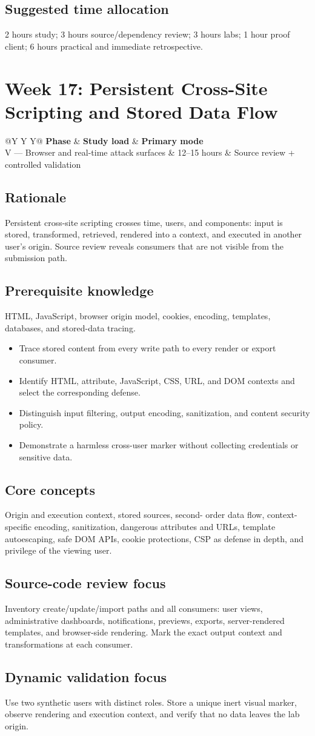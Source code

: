 \documentclass[11pt]{article}
\makeatletter
\newcommand{\weekheader}[4]{%
  \clearpage
  \section{Week #1: #2}
  \begin{tcolorbox}[colback=Navy,colframe=Navy,coltext=white]
    \begin{tabularx}{\linewidth}{@{}Y Y Y@{}}
      \textbf{Phase} & \textbf{Study load} & \textbf{Primary mode}\\
      #3 & #4 hours & Source review + controlled validation
    \end{tabularx}
  \end{tcolorbox}
}
\newcommand{\weekfield}[2]{%
  \Needspace{5\baselineskip}
  \subsection*{#1}
  #2
}
\makeatother
\begin{document}
\weekfield{Suggested time allocation}{2 hours study; 3 hours source/dependency
review; 3 hours labs; 1 hour proof client; 6 hours practical and immediate
retrospective.}

\weekheader{17}{Persistent Cross-Site Scripting and Stored Data Flow}{V --- Browser and real-time attack surfaces}{12--15}

\weekfield{Rationale}{Persistent cross-site scripting crosses time, users, and
components: input is stored, transformed, retrieved, rendered into a context, and
executed in another user's origin. Source review reveals consumers that are not
visible from the submission path.}

\weekfield{Prerequisite knowledge}{HTML, JavaScript, browser origin model,
cookies, encoding, templates, databases, and stored-data tracing.}

\begin{objectivebox}
\begin{itemize}
  \item Trace stored content from every write path to every render or export consumer.
  \item Identify HTML, attribute, JavaScript, CSS, URL, and DOM contexts and select the corresponding defense.
  \item Distinguish input filtering, output encoding, sanitization, and content security policy.
  \item Demonstrate a harmless cross-user marker without collecting credentials or sensitive data.
\end{itemize}
\end{objectivebox}

\weekfield{Core concepts}{Origin and execution context, stored sources, second-
order data flow, context-specific encoding, sanitization, dangerous attributes and
URLs, template autoescaping, safe DOM APIs, cookie protections, CSP as defense in
depth, and privilege of the viewing user.}

\weekfield{Source-code review focus}{Inventory create/update/import paths and all
consumers: user views, administrative dashboards, notifications, previews,
exports, server-rendered templates, and browser-side rendering. Mark the exact
output context and transformations at each consumer.}

\weekfield{Dynamic validation focus}{Use two synthetic users with distinct roles.
Store a unique inert visual marker, observe rendering and execution context, and
verify that no data leaves the lab origin.}
\end{document}
